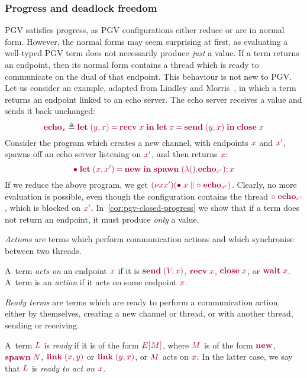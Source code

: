 \documentclass[main.tex]{subfiles}
\begin{document}
\subsubsection*{Progress and deadlock freedom}
PGV satisfies progress, as PGV configurations either reduce or are in normal form. However, the normal forms may seem surprising at first, as evaluating a well-typed PGV term does not necessarily produce \emph{just} a value. If a term returns an endpoint, then its normal form contains a thread which is ready to communicate on the dual of that endpoint. This behaviour is not new to PGV. Let us consider an example, adapted from Lindley and Morris~\cite{lindleymorris15}, in which a term returns an endpoint linked to an echo server. The echo server receives a value and sends it back unchanged:
\[
  \tm{\echo_x} \defeq \tm{\letpair{y}{x}{\recv\;{x}}{\letbind{x}{\send\;\pair{y}{x}}{\close\;x}}}
\]
Consider the program which creates a new channel, with endpoints $\tm{x}$ and $\tm{x'}$, spawns off an echo server listening on $\tm{x'}$, and then returns $\tm{x}$:
\[
  \tm{\main\;\letpair{x}{x'}{\new}{\andthen{\spawn\;(\lambda\unit.\echo_{x'})}}{x}}
\]
If we reduce the above program, we get $\tm{\res{x}{x'}{(\ppar{\main\;x}{\child\;\echo_{x'}})}}$. Clearly, no more evaluation is possible, even though the configuration contains the thread $\tm{\child\;\echo_{x'}}$, which is blocked on $\tm{x'}$. In~\cref{cor:pgv-closed-progress} we show that if a term does not return an endpoint, it must produce \emph{only} a value.

\emph{Actions} are terms which perform communication actions and which synchronise between two threads.
\begin{definition}[Actions]
  \label{def:pgv-actions}
  A~term \emph{acts on} an endpoint $\tm{x}$ if it is $\tm{\send\;\pair{V}{x}}$, $\tm{\recv\;{x}}$, $\tm{\close\;{x}}$, or $\tm{\wait\;{x}}$. A~term is an \emph{action} if it acts on some endpoint $\tm{x}$.
\end{definition}

\emph{Ready terms} are terms which are ready to perform a communication action, either by themselves, \eg creating a new channel or thread, or with another thread, \eg sending or receiving.
\begin{definition}
  \label{def:pgv-ready-actions}
  A~term $\tm{L}$ is \emph{ready} if it is of the form $\tm{\plug{E}{M}}$, where $\tm{M}$ is of the form $\tm{\new}$, $\tm{\spawn\;N}$, $\tm{\link\;\pair{x}{y}}$ or $\tm{\link\;\pair{y}{x}}$, or $\tm{M}$ acts on $\tm{x}$. In the latter case, we say that $\tm{L}$ is \emph{ready to act on} $\tm{x}$.
\end{definition}
\end{document}
